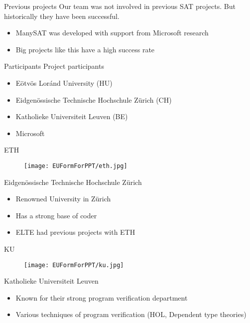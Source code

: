 \begin{frame}{Previous projects}
    Our team was not involved in previous SAT projects. But historically they have been successful.
    \begin{itemize}
        \item ManySAT was developed with support from Microsoft research
        \item Big projects like this have a high success rate
    \end{itemize}
\end{frame}

\begin{frame}{Participants}
    Project participants
    \begin{itemize}
        \item Eötvös Loránd University (HU)
        \item Eidgenössische Technische Hochschule Zürich (CH)
        \item Katholieke Universiteit Leuven (BE)
        \item Microsoft
    \end{itemize}
\end{frame}

\begin{frame}{ETH}
    \begin{figure}
        \centering
        \texttt{[image: EUFormForPPT/eth.jpg]}
        \label{fig:eth-logo}
    \end{figure}
    Eidgenössische Technische Hochschule Zürich
    \begin{itemize}
        \item Renowned University in Zürich
        \item Has a strong base of coder
        \item ELTE had previous projects with ETH
    \end{itemize} 
\end{frame}


\begin{frame}{KU}
    \begin{figure}
        \centering
        \texttt{[image: EUFormForPPT/ku.jpg]}
        \label{fig:ku-logo}
    \end{figure}
    Katholieke Universiteit Leuven
    \begin{itemize}
        \item Known for their strong program verification department
        \item Various techniques of program verification (HOL, Dependent type theories)
    \end{itemize} 
\end{frame}


